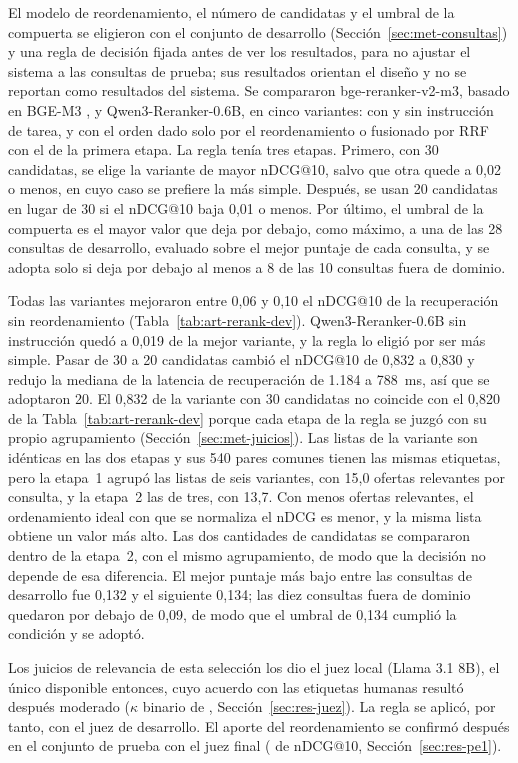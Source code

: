 El modelo de reordenamiento, el número de candidatas y el umbral de la compuerta se eligieron con el conjunto de desarrollo (Sección~\ref{sec:met-consultas}) y una regla de decisión fijada antes de ver los resultados, para no ajustar el sistema a las consultas de prueba; sus resultados orientan el diseño y no se reportan como resultados del sistema. Se compararon bge-reranker-v2-m3, basado en BGE-M3 \citep{Chen2024M3}, y Qwen3-Reranker-0.6B, en cinco variantes: con y sin instrucción de tarea, y con el orden dado solo por el reordenamiento o fusionado por RRF con el de la primera etapa. La regla tenía tres etapas. Primero, con 30 candidatas, se elige la variante de mayor nDCG@10, salvo que otra quede a 0,02 o menos, en cuyo caso se prefiere la más simple. Después, se usan 20 candidatas en lugar de 30 si el nDCG@10 baja 0,01 o menos. Por último, el umbral de la compuerta es el mayor valor que deja por debajo, como máximo, a una de las 28 consultas de desarrollo, evaluado sobre el mejor puntaje de cada consulta, y se adopta solo si deja por debajo al menos a 8 de las 10 consultas fuera de dominio.


Todas las variantes mejoraron entre 0,06 y 0,10 el nDCG@10 de la recuperación sin reordenamiento (Tabla~\ref{tab:art-rerank-dev}). Qwen3-Reranker-0.6B sin instrucción quedó a 0,019 de la mejor variante, y la regla lo eligió por ser más simple. Pasar de 30 a 20 candidatas cambió el nDCG@10 de 0,832 a 0,830 y redujo la mediana de la latencia de recuperación de 1.184 a 788~ms, así que se adoptaron 20. El 0,832 de la variante con 30 candidatas no coincide con el 0,820 de la Tabla~\ref{tab:art-rerank-dev} porque cada etapa de la regla se juzgó con su propio agrupamiento (Sección~\ref{sec:met-juicios}). Las listas de la variante son idénticas en las dos etapas y sus 540 pares comunes tienen las mismas etiquetas, pero la etapa~1 agrupó las listas de seis variantes, con 15,0 ofertas relevantes por consulta, y la etapa~2 las de tres, con 13,7. Con menos ofertas relevantes, el ordenamiento ideal con que se normaliza el nDCG es menor, y la misma lista obtiene un valor más alto. Las dos cantidades de candidatas se compararon dentro de la etapa~2, con el mismo agrupamiento, de modo que la decisión no depende de esa diferencia. El mejor puntaje más bajo entre las consultas de desarrollo fue 0,132 y el siguiente 0,134; las diez consultas fuera de dominio quedaron por debajo de 0,09, de modo que el umbral de 0,134 cumplió la condición y se adoptó.

Los juicios de relevancia de esta selección los dio el juez local (Llama 3.1 8B), el único disponible entonces, cuyo acuerdo con las etiquetas humanas resultó después moderado ($\kappa$ binario de \cKappaLocal, Sección~\ref{sec:res-juez}). La regla se aplicó, por tanto, con el juez de desarrollo. El aporte del reordenamiento se confirmó después en el conjunto de prueba con el juez final (\cDifReord{} de nDCG@10, Sección~\ref{sec:res-pe1}).
